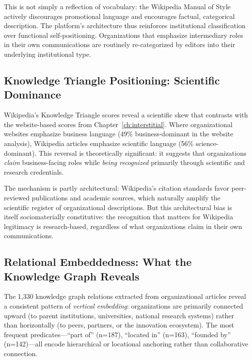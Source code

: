 \documentclass[../main.tex]{subfiles}
\begin{document}
This is not simply a reflection of vocabulary: the Wikipedia Manual of Style actively discourages promotional language and encourages factual, categorical description. The platform's architecture thus reinforces institutional classification over functional self-positioning. Organizations that emphasize intermediary roles in their own communications are routinely re-categorized by editors into their underlying institutional type.

\subsection{Knowledge Triangle Positioning: Scientific Dominance}

Wikipedia's Knowledge Triangle scores reveal a scientific skew that contrasts with the website-based scores from Chapter~\ref{ch:interstitial}. Where organizational websites emphasize business language (49\% business-dominant in the website analysis), Wikipedia articles emphasize scientific language (56\% science-dominant). This reversal is theoretically significant: it suggests that organizations \emph{claim} business-facing roles while \emph{being recognized} primarily through scientific and research credentials.

The mechanism is partly architectural: Wikipedia's citation standards favor peer-reviewed publications and academic sources, which naturally amplify the scientific register of organizational descriptions. But this architectural bias is itself sociomaterially constitutive: the recognition that matters for Wikipedia legitimacy is research-based, regardless of what organizations claim in their own communications.

\subsection{Relational Embeddedness: What the Knowledge Graph Reveals}

The 1,330 knowledge graph relations extracted from organizational articles reveal a consistent pattern of \emph{vertical embedding}: organizations are primarily connected upward (to parent institutions, universities, national research systems) rather than horizontally (to peers, partners, or the innovation ecosystem). The most frequent predicates---``part of'' (n=187), ``located in'' (n=163), ``founded by'' (n=142)---all encode hierarchical or locational anchoring rather than collaborative connection.
\end{document}
